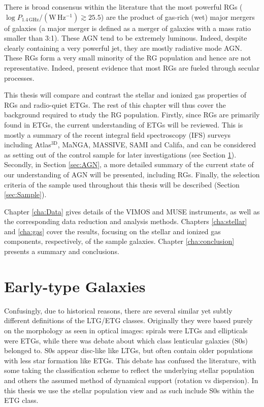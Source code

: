 	There is broad consensus within the literature that the most powerful RGs \linebreak($\log P_\mathrm{1.4\, GHz}/(\mathrm{W \, Hz^{-1}}) \gtrsim 25.5$) are the product of gas-rich (wet) major mergers of galaxies (a major merger is defined as a merger of galaxies with a mass ratio smaller than 3:1). These AGN tend to be extremely luminous. Indeed, despite clearly containing a very powerful jet, they are mostly radiative mode AGN. These RGs form a very small minority of the RG population and hence are not representative. Indeed, \citet{Heckman2014} present evidence that most RGs are fueled through secular processes.

	This thesis will compare and contrast the stellar and ionized gas properties of RGs and radio-quiet ETGs. The rest of this chapter will thus cover the background required to study the RG population. Firstly, since RGs are primarily found in ETGs, the current understanding of ETGs will be reviewed. This is mostly a summary of the recent integral field spectroscopy (IFS) surveys including Atlas$^\text{3D}$, MaNGA, MASSIVE, SAMI and Califa, and can be considered as setting out of the control sample for later investigations (see Section \ref{sec:ETG}). Secondly, in Section \ref{sec:AGN}, a more detailed summary of the current state of our understanding of AGN will be presented, including RGs. Finally, the selection criteria of the sample used throughout this thesis will be described (Section \ref{sec:Sample}).

	Chapter \ref{cha:Data} gives details of the VIMOS and MUSE instruments, as well as the corresponding data reduction and analysis methods. Chapters \ref{cha:stellar} and \ref{cha:gas} cover the results, focusing on the stellar and ionized gas components, respectively, of the sample galaxies. Chapter \ref{cha:conclusion} presents a summary and conclusions. 

\section{Early-type Galaxies}
	\label{sec:ETG}
	Confusingly, due to historical reasons, there are several similar yet subtly different definitions of the LTG/ETG classes. Originally they were based purely on the morphology as seen in optical images: spirals were LTGs and ellipticals were ETGs, while there was debate about which class lenticular galaxies (S0s) belonged to. S0s appear disc-like like LTGs, but often contain older populations with less star formation like ETGs. This debate has confused the literature, with some taking the classification scheme to reflect the underlying stellar population and others the assumed method of dynamical support (rotation vs dispersion). In this thesis we use the stellar population view and as such include S0s within the ETG class.

